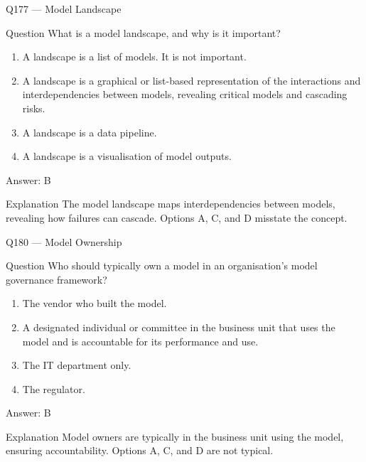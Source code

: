 \documentclass[aspectratio=169,8pt]{beamer}
\begin{document}
\begin{frame}{Q177 --- Model Landscape}
\begin{block}{Question}
What is a model landscape, and why is it important?
\begin{enumerate}
\item A landscape is a list of models. It is not important.
\item A landscape is a graphical or list-based representation of the interactions and interdependencies between models, revealing critical models and cascading risks.
\item A landscape is a data pipeline.
\item A landscape is a visualisation of model outputs.
\end{enumerate}  \end{block}
\begin{exampleblock}{Answer: B}\end{exampleblock}
\begin{block}{Explanation}
The model landscape maps interdependencies between models, revealing how failures can cascade. Options A, C, and D misstate the concept.
\end{block}
\end{frame}





\begin{frame}{Q180 --- Model Ownership}
\begin{block}{Question}
Who should typically own a model in an organisation's model governance framework?
\begin{enumerate}
\item The vendor who built the model.
\item A designated individual or committee in the business unit that uses the model and is accountable for its performance and use.
\item The IT department only.
\item The regulator.
\end{enumerate}  \end{block}
\begin{exampleblock}{Answer: B}\end{exampleblock}
\begin{block}{Explanation}
Model owners are typically in the business unit using the model, ensuring accountability. Options A, C, and D are not typical.
\end{block}
\end{frame}
\end{document}

